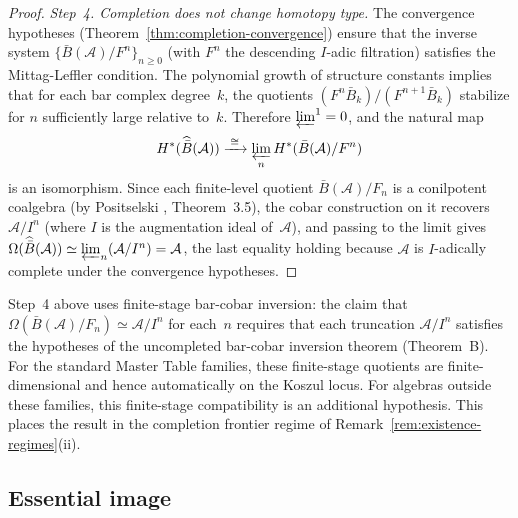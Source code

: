 \begin{proof}
\emph{Step~4. Completion does not change homotopy type.}
The convergence hypotheses (Theorem~\ref{thm:completion-convergence}) ensure that the inverse system $\{\bar{B}(\mathcal{A})/F^n\}_{n \geq 0}$ (with $F^n$ the descending $I$-adic filtration) satisfies the Mittag-Leffler condition.  The polynomial growth of structure constants implies that for each bar complex degree~$k$, the quotients $(F^n \bar{B}_k)/(F^{n+1} \bar{B}_k)$ stabilize for $n$ sufficiently large relative to~$k$.  Therefore $\varprojlim^1 = 0$, and the natural map
\[
H^*(\widehat{\bar{B}}(\mathcal{A})) \xrightarrow{\;\cong\;} \varprojlim_n H^*(\bar{B}(\mathcal{A})/F^n)
\]
is an isomorphism.  Since each finite-level quotient $\bar{B}(\mathcal{A})/F_n$ is a conilpotent coalgebra (by Positselski \cite{Positselski11}, Theorem~3.5), the cobar construction on it recovers~$\mathcal{A}/I^n$ (where $I$ is the augmentation ideal of~$\mathcal{A}$), and passing to the limit gives $\Omega(\widehat{\bar{B}}(\mathcal{A})) \simeq \varprojlim_n (\mathcal{A}/I^n) = \mathcal{A}$, the last equality holding because $\mathcal{A}$ is $I$-adically complete under the convergence hypotheses.
\end{proof}

\begin{remark}\label{rem:completed-bar-cobar-frontier}
Step~4 above uses finite-stage bar-cobar inversion: the claim that
$\Omega(\bar{B}(\mathcal{A})/F_n) \simeq \mathcal{A}/I^n$ for each~$n$
requires that each truncation $\mathcal{A}/I^n$ satisfies the hypotheses
of the uncompleted bar-cobar inversion theorem (Theorem~B).  For the
standard Master Table families, these finite-stage quotients are
finite-dimensional and hence automatically on the Koszul locus.  For
algebras outside these families, this finite-stage compatibility is an
additional hypothesis.  This places the result in the completion
frontier regime of Remark~\ref{rem:existence-regimes}(ii).
\end{remark}

\subsection{Essential image}

